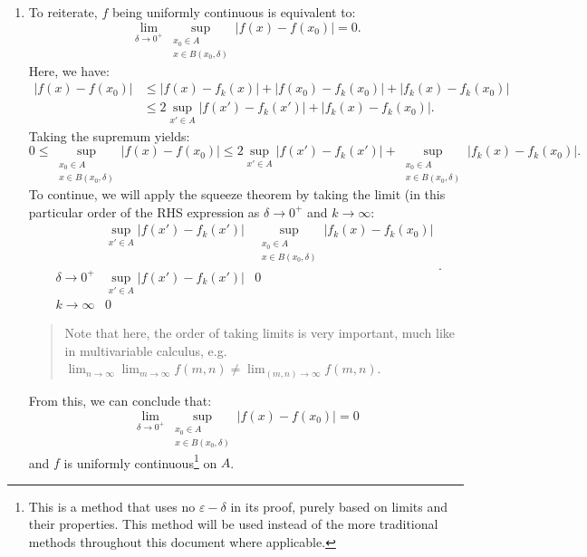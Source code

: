 \begin{enumerate}[label=\textbf{2E.\arabic*}]
  \item 
    To reiterate, \( f \) being uniformly continuous is equivalent to:
    \[
      \lim_{\delta \to 0^{+}} \sup_{\substack{x_{0} \in A\\x \in B(x_{0}, \delta)}}
      |f(x)-f(x_{0})| = 0
    .\] 
    Here, we have:
    \begin{align*}
      |f(x)-f(x_{0})| &\le |f(x)-f_{k}(x)| + |f(x_{0})-f_{k}(x_{0})| +
      |f_{k}(x)-f_{k}(x_{0})|\\
                      &\le 2\sup_{x' \in A} |f(x')-f_{k}(x')| +
                      |f_{k}(x)-f_{k}(x_{0})|
    .\end{align*}
    Taking the supremum yields:
    \[
      0 \le \sup_{\substack{x_{0} \in A\\x \in B(x_{0}, \delta)}} |f(x)-f(x_{0})| \le
      2\sup_{x' \in A} |f(x')-f_{k}(x')| + \sup_{\substack{x_{0} \in A\\x \in
      B(x_{0}, \delta)}} |f_{k}(x)-f_{k}(x_{0})|
    .\] 
    To continue, we will apply the squeeze theorem by taking the limit (in this
    particular order of the RHS expression as \( \delta \to 0^{+} \) and \( k
    \to \infty \):
    \[
      \begin{array}{c|c|c}
        & \sup\limits_{x' \in A} |f(x')-f_{k}(x')| & \sup\limits_{\substack{x_{0} \in
        A\\ x \in B(x_{0}, \delta)}}|f_{k}(x)-f_{k}(x_{0})|
        \\
        \hline
        \delta \to 0^{+} & \sup\limits_{x' \in A} |f(x')-f_{k}(x')| & 0\\
        \hline
        k \to \infty & 0 & 
      \end{array}
    .\] 
    \begin{quote}
      Note that here, the order of taking limits is very important, much like in
      multivariable calculus, e.g. \( \lim_{n \to \infty} \lim_{m \to \infty} f(m, n)
      \neq \lim_{(m, n) \to \infty} f(m, n) \).
    \end{quote}
    From this, we can conclude that:
    \[
      \lim_{\delta \to 0^{+}} \sup_{\substack{x_{0} \in A\\x \in B(x_{0}, \delta)}}
      |f(x)-f(x_{0})| = 0
    \] and \( f \) is uniformly continuous\footnote{This is a method that uses
    no \( \varepsilon-\delta \) in its proof, purely based on limits and their
  properties. This method will be used instead of the more traditional methods
  throughout this document where applicable.} on \( A \).


\end{enumerate}
